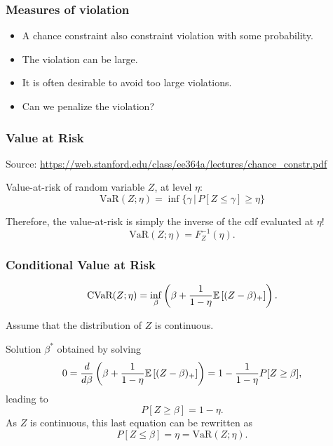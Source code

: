 \documentclass{beamer}
\begin{document}
\begin{frame}
\frametitle{Measures of violation}

\begin{itemize}
\item 
A chance constraint also constraint violation with some probability.
\item
The violation can be large.
\item
It is often desirable to avoid too large violations.
\item
Can we penalize the violation?
\end{itemize}

\end{frame}

\begin{frame}
\frametitle{Value at Risk}

Source: \url{https://web.stanford.edu/class/ee364a/lectures/chance_constr.pdf}

\mbox{}

Value-at-risk of random variable $Z$, at level $\eta$:
$$
\text{VaR}(Z;\eta) = \inf \{ \gamma \,|\, P[Z \leq \gamma] \geq \eta \}
$$

\mbox{}

Therefore, the value-at-risk is simply the inverse of the cdf evaluated at $\eta$!
$$
\text{VaR}(Z;\eta) = F_Z^{-1}(\eta).
$$

\end{frame}

\begin{frame}
\frametitle{Conditional Value at Risk}

$$
\text{CVaR}(Z; \eta) = \inf_{\beta} \left( \beta + \frac{1}{1 - \eta} {\mathbb{E}} \left[ (Z - \beta)_+ \right] \right).
$$

\mbox{}

Assume that the distribution of $Z$ is continuous.

\mbox{}

Solution $\beta^*$ obtained by solving
$$
0 = \frac{d}{d \beta} \left( \beta + \frac{1}{1 - \eta} {\mathbb{E}} \left[ (Z - \beta)_+ \right] \right)
= 1 - \frac{1}{1 - \eta} P[ Z \geq \beta ],
$$
leading to
$$
P[ Z \geq \beta ] = 1 - \eta.
$$
As $Z$ is continuous, this last equation can be rewritten as
$$
P[ Z \leq \beta ] = \eta = \text{VaR}(Z; \eta).
$$

\end{frame}
\end{document}
